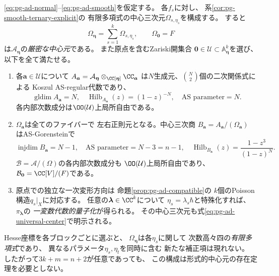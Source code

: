 \begin{theorem}[任意次元の明示的な同時代数量子化]
\label{thm:pg-all-dimensions}
\eqref{eq:pg-ad-normal}--\eqref{eq:pg-ad-smooth}を仮定する。
各$f_s$に対し、
系\ref{cor:pg-smooth-ternary-explicit}の
有限多項式の中心三次元$\Omega_{s,\eta_s}$を構成する。
すると
\begin{equation}
 \boxed{\qquad
 \Omega_{\boldsymbol\eta}=\sum_{s=1}^k\Omega_{s,\eta_s},
 \qquad
 \Omega_{\boldsymbol0}=F
 \qquad}
 \label{eq:pg-ad-universal-center}
\end{equation}
は$\mathcal A_{\boldsymbol\eta}$の\emph{厳密な中心元}である。
また原点を含むZariski開集合
$\boldsymbol0\in\mathcal U\subset\mathbb A^k_{\boldsymbol\eta}$を選び、
以下を全て満たせる。
\begin{enumerate}[label=(\arabic*)]
\item 各$\boldsymbol a\in\mathcal U$について
$A_{\boldsymbol a}=\mathcal A_{\boldsymbol\eta}
 \otimes_{\CC[\boldsymbol\eta]}\CC_{\boldsymbol a}$
は$N$生成元、$\binom N2$個の二次関係式による
Koszul AS-regular代数であり、
\begin{equation}
 \operatorname{gldim}A_{\boldsymbol a}=N,\quad
 \operatorname{Hilb}_{A_{\boldsymbol a}}(z)=(1-z)^{-N},
 \quad\text{AS parameter}=N.
\end{equation}
各内部次数成分は$\OO(\mathcal U)$上局所自由である。
\item $\Omega_{\boldsymbol a}$は全てのファイバーで
左右正則元となる。中心三次商
$B_{\boldsymbol a}=A_{\boldsymbol a}/(\Omega_{\boldsymbol a})$
はAS-Gorensteinで
\begin{equation}
 \operatorname{injdim}B_{\boldsymbol a}=N-1,\quad
 \text{AS parameter}=N-3=n-1,\quad
 \operatorname{Hilb}_{B_{\boldsymbol a}}(z)
 =\frac{1-z^3}{(1-z)^N}.
\end{equation}
$\mathcal B=\mathcal A/(\Omega)$の各内部次数成分も
$\OO(\mathcal U)$上局所自由であり、
$\mathcal B_{\boldsymbol0}=\CC[V]/(F)$である。
\item 原点での独立な一次変形方向は
命題\ref{prop:pg-ad-compatible}の
$k$個のPoisson構造$q_s|_X$に対応する。
任意の$\boldsymbol\lambda\in\CC^k$について
$\eta_s=\lambda_s\hbar$と特殊化すれば、
$\pi_{\boldsymbol\lambda}$の
\emph{一変数代数的量子化}が得られる。
その中心三次元も式\eqref{eq:pg-ad-universal-center}で明示される。
\end{enumerate}
Hesse座標を各ブロックごとに選ぶと、
$\Omega_{\boldsymbol\eta}$は各$\eta_s$に関して
次数高々四の\emph{有限多項式}であり、
異なるパラメータ$\eta_s,\eta_t$を同時に含む
新たな補正項は現れない。
したがって$3k+m=n+2$が任意であっても、
この構成は形式的中心元の存在定理を必要としない。
\end{theorem}
